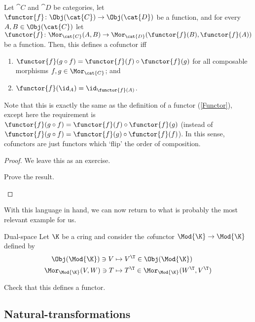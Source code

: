 \begin{prp}{}{}
	Let $\cat{C}$ and $\cat{D}$ be categories, let $\functor{f}\colon \Obj (\cat{C})\rightarrow \Obj (\cat{D})$ be a function, and for every $A,B\in \Obj (\cat{C})$ let $\functor{f}\colon \Mor _{\cat{C}}(A,B)\rightarrow \Mor _{\cat{D}}(\functor{f}(B),\functor{f}(A))$ be a function.  Then, this defines a cofunctor iff
	\begin{enumerate}
		\item $\functor{f}(g\circ f)=\functor{f}(f)\circ \functor{f}(g)$ for all composable morphisms $f,g\in \Mor _{\cat{C}}$; and
		\item $\functor{f}(\id _A)=\id _{\functor{f}(A)}$.
	\end{enumerate}
	\begin{rmk}
		Note that this is exactly the same as the definition of a functor (\cref{Functor}), except here the requirement is $\functor{f}(g\circ f)=\functor{f}(f)\circ \functor{f}(g)$ (instead of $\functor{f}(g\circ f)=\functor{f}(g)\circ \functor{f}(f)$).  In this sense, cofunctors are just functors which `flip' the order of composition.
	\end{rmk}
	\begin{proof}
		We leave this as an exercise.
		\begin{exr}[breakable=false]{}{}
			Prove the result.
		\end{exr}
	\end{proof}
\end{prp}
With this language in hand, we can now return to what is probably the most relevant example for us.
\begin{exm}{Dual-space}{}
	Let $\K$ be a cring and consider the \emph{co}functor $\Mod{\K}\rightarrow \Mod{\K}$ defined by
	\begin{subequations}
		\begin{align*}
		\Obj (\Mod{\K})\ni V & \mapsto V^{\T}\in \Obj (\Mod{\K}) \\
		\Mor _{\Mod{\K}}(V,W)\ni T & \mapsto T^{\T}\in \Mor _{\Mod{\K}}(W^{\T},V^{\T})
		\end{align*}
	\end{subequations}
	\begin{exr}[breakable=false]{}{}
		Check that this defines a functor.
	\end{exr}
\end{exm}

\subsection{Natural-transformations}\label{sbsB.2.2}

